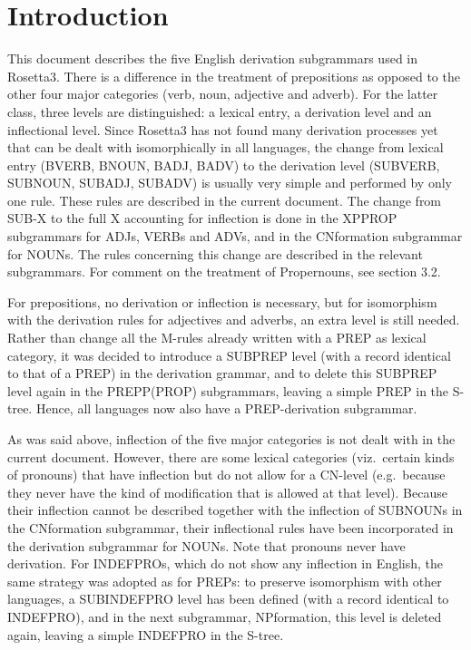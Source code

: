 
   \RosSupersedes{-}
   \MakeRosTitle
%
%

\newpage
\section{Introduction}
This document describes the five English derivation subgrammars used in 
Rosetta3. There is a difference in the treatment of prepositions as opposed to 
the other four major categories (verb, noun, adjective and adverb). For the 
latter class, three
levels are distinguished: a lexical entry, a derivation level and an 
inflectional level. Since Rosetta3 has not found many derivation processes yet 
that can be dealt with isomorphically in all languages, the change 
from lexical entry (BVERB, BNOUN, BADJ, BADV) to the derivation level 
(SUBVERB, SUBNOUN, SUBADJ, SUBADV) is 
usually very simple and performed by only one rule. These rules are described 
in the current document. The change from SUB-X to
the full X accounting for inflection is done in the XPPROP subgrammars for 
ADJs, VERBs and ADVs, and in 
the CNformation subgrammar for NOUNs. The rules concerning this change are 
described in the relevant subgrammars. For comment on 
the treatment of Propernouns, see section 3.2.

For prepositions, no derivation or inflection is necessary, 
but for isomorphism with the 
derivation rules for adjectives and adverbs, an extra level is still needed. 
Rather than change all the M-rules already written with a PREP as lexical 
category, it was decided to introduce a SUBPREP level (with a record identical 
to that of a PREP) in the derivation grammar, and to delete this SUBPREP level 
again in the PREPP(PROP) subgrammars, leaving a simple PREP in the S-tree. 
Hence, all languages now also have a PREP-derivation subgrammar.

As was said above, inflection of the five major categories is not dealt with 
in the current document. However, there are some lexical categories 
(viz.\ certain kinds of pronouns) that have inflection but do not allow for a 
CN-level (e.g.\ because they never have the kind of modification that is 
allowed at that level). Because their inflection cannot be described together 
with the inflection of SUBNOUNs in the CNformation subgrammar, 
their inflectional 
rules have been incorporated in the derivation subgrammar for NOUNs. 
Note that pronouns never have derivation. For INDEFPROs, which do not show any 
inflection in English, the same strategy was adopted as for PREPs: to preserve 
isomorphism with other languages, a SUBINDEFPRO level has been defined (with a 
record identical to INDEFPRO), and in the next subgrammar, NPformation, this 
level is deleted again, leaving a simple INDEFPRO in the S-tree. 


